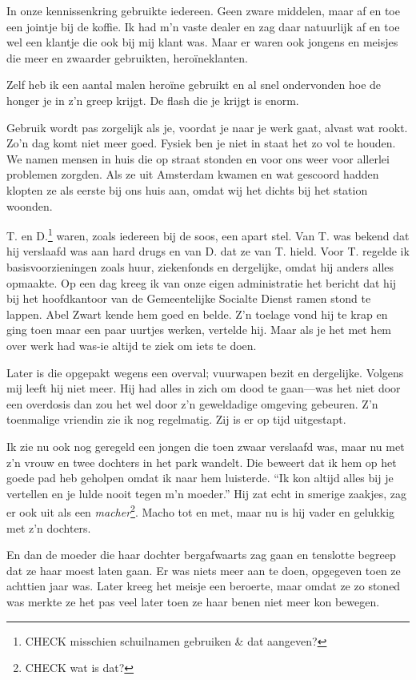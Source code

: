 \documentclass[12pt,twoside]{memoir}
\begin{document}
In onze kennissenkring gebruikte iedereen. Geen zware middelen, maar af en toe een jointje bij de koffie. Ik had m’n vaste dealer en zag daar natuurlijk af en toe wel een klantje die ook bij mij klant was. Maar er waren ook jongens en meisjes die meer en zwaarder gebruikten, heroïneklanten. 

Zelf heb ik een aantal malen heroïne gebruikt en al snel ondervonden hoe de honger je in z’n greep krijgt. De flash die je krijgt is enorm.

Gebruik wordt pas zorgelijk als je, voordat je naar je werk gaat, alvast wat rookt. Zo’n dag komt niet meer goed. Fysiek ben je niet in staat het zo vol te houden. We namen mensen in huis die op straat stonden en voor ons weer voor allerlei problemen zorgden. Als ze uit Amsterdam kwamen en wat gescoord hadden klopten ze als eerste bij ons huis aan, omdat wij het dichts bij het station woonden. 

T. en D.\footnote{CHECK misschien schuilnamen gebruiken \& dat aangeven?} waren, zoals iedereen bij de soos, een apart stel. Van T. was bekend dat hij verslaafd was aan hard drugs en van D. dat ze van T. hield. Voor T. regelde ik basisvoorzieningen zoals huur, ziekenfonds en dergelijke, omdat hij anders alles opmaakte. Op een dag kreeg ik van onze eigen administratie het bericht dat hij bij het hoofdkantoor van de Gemeentelijke Socialte Dienst ramen stond te lappen. Abel Zwart kende hem goed en belde. Z’n toelage vond hij te krap en ging toen maar een paar uurtjes werken, vertelde hij. Maar als je het met hem over werk had was-ie altijd te ziek om iets te doen. 

Later is die opgepakt wegens een overval; vuurwapen bezit en dergelijke. Volgens mij leeft hij niet meer. Hij had alles in zich om dood te gaan---was het niet door een overdosis dan zou het wel door z’n geweldadige omgeving gebeuren. Z’n toenmalige vriendin zie ik nog regelmatig. Zij is er op tijd uitgestapt.

Ik zie nu ook nog geregeld een jongen die toen zwaar verslaafd was, maar nu met z’n vrouw en twee dochters in het park wandelt. Die beweert dat ik hem op het goede pad heb geholpen omdat ik naar hem luisterde. ``Ik kon altijd alles bij je vertellen en je lulde nooit tegen m’n moeder.'' Hij zat echt in smerige zaakjes, zag er ook uit als een \emph{macher}\footnote{CHECK wat is dat?}. Macho tot en met, maar nu is hij vader en gelukkig met z’n dochters. 

En dan de moeder die haar dochter bergafwaarts zag gaan en tenslotte begreep dat ze haar moest laten gaan. Er was niets meer aan te doen, opgegeven toen ze achttien jaar was. Later kreeg het meisje een beroerte, maar omdat ze zo stoned was merkte ze het pas veel later toen ze haar benen niet meer kon bewegen. 
\end{document}
